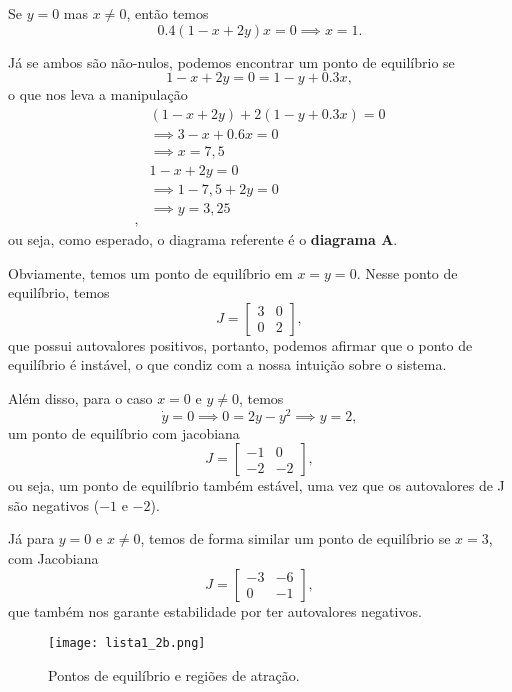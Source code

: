 \documentclass[a4paper]{report}
\begin{document}
Se $y=0$ mas $x\neq 0$, então temos \[
0.4\left( 1-x+2y \right) x = 0 \implies x=1
.\]

Já se ambos são não-nulos, podemos encontrar um ponto de equilíbrio se \[
1-x+2y = 0 = 1-y+0.3x
,\] o que nos leva a manipulação
\begin{align*}
    &\left( 1-x+2y \right) + 2\left( 1-y+0.3x \right) = 0 \\
    &\implies 3-x+0.6x = 0 \\
    &\implies x = 7,5 \\
    &1-x+2y = 0 \\
    &\implies 1-7,5 + 2y = 0 \\
    &\implies y=3,25 \\
,\end{align*}
ou seja, como esperado, o diagrama referente é o \textbf{diagrama A}.



Obviamente, temos um ponto de equilíbrio em $x=y=0$. Nesse ponto de equilíbrio, temos  \[
    J = \begin{bmatrix} 3 & 0 \\ 0 & 2 \end{bmatrix} 
,\] que possui autovalores positivos, portanto, podemos afirmar que o ponto de equilíbrio é instável, o que condiz com a nossa intuição sobre o sistema.

Além disso, para o caso $x=0$ e $y\neq 0$, temos \[
\dot{y} = 0 \implies 0 = 2y - y^2 \implies y = 2
,\] um ponto de equilíbrio com jacobiana \[
J = \begin{bmatrix} 
    -1 & 0 \\
    -2 & -2
\end{bmatrix} 
,\] ou seja, um ponto de equilíbrio também estável, uma vez que os autovalores de J são negativos ($-1$ e  $-2$).

Já para $y=0$ e $x\neq 0$, temos de forma similar um ponto de equilíbrio se $x=3$, com Jacobiana  \[
J = \begin{bmatrix} 
    -3 & -6 \\
    0 & -1
\end{bmatrix} 
,\] que também nos garante estabilidade por ter autovalores negativos.


\begin{figure}[H]
    \centering
    \texttt{[image: lista1\_2b.png]}
    \caption{Pontos de equilíbrio e regiões de atração.}
    \label{fig:lista1_2b-png}
\end{figure}
\end{document}
